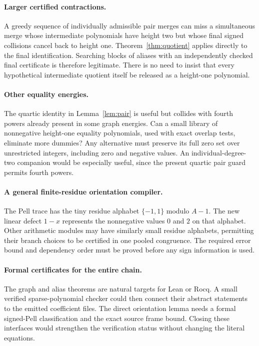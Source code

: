 \documentclass[11pt,letterpaper]{article}
\theoremstyle{definition}\newtheorem{definition}[theorem]{Definition}
\theoremstyle{remark}\newtheorem{remark}[theorem]{Remark}
\begin{document}
\paragraph{Larger certified contractions.}
A greedy sequence of individually admissible pair merges can miss a
simultaneous merge whose intermediate polynomials have height two but whose
final signed collisions cancel back to height one. Theorem~\ref{thm:quotient}
applies directly to the final identification. Searching blocks of aliases
with an independently checked final certificate is therefore legitimate.
There is no need to insist that every hypothetical intermediate quotient
itself be released as a height-one polynomial.

\paragraph{Other equality energies.}
The quartic identity in Lemma~\ref{lem:pair} is useful but collides with
fourth powers already present in some graph energies. Can a small library
of nonnegative height-one equality polynomials, used with exact overlap
tests, eliminate more dummies? Any alternative must preserve its full zero
set over unrestricted integers, including zero and negative values. An
individual-degree-two companion would be especially useful, since the
present quartic pair guard permits fourth powers.

\paragraph{A general finite-residue orientation compiler.}
The Pell trace has the tiny residue alphabet $\{-1,1\}$ modulo $A-1$.
The new linear defect $1-x$ represents the nonnegative values $0$ and $2$
on that alphabet. Other arithmetic modules may have similarly small
residue alphabets, permitting their branch choices to be certified in one
pooled congruence. The required error bound and dependency order must be
proved before any sign information is used.

\paragraph{Formal certificates for the entire chain.}
The graph and alias theorems are natural targets for Lean or Rocq. A small
verified sparse-polynomial checker could then connect their abstract
statements to the emitted coefficient files. The direct orientation lemma
needs a formal signed-Pell classification and the exact source frame bound.
Closing these interfaces would strengthen the verification status without
changing the literal equations.
\end{document}
